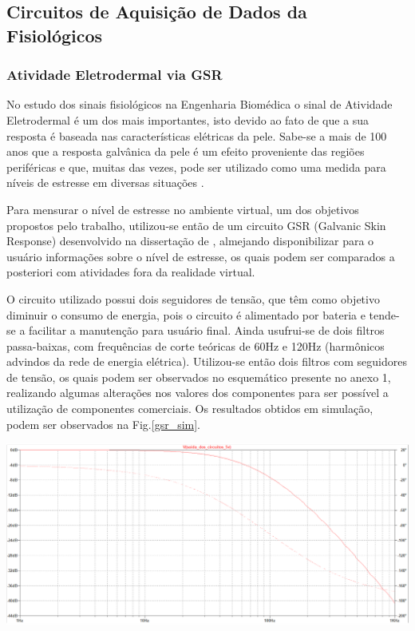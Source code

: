     

\subsection{Circuitos de Aquisição de Dados da Fisiológicos}

\subsubsection{Atividade Eletrodermal via GSR}
    No estudo dos sinais fisiológicos na Engenharia Biomédica o sinal de Atividade Eletrodermal é um dos mais importantes, isto devido ao fato de que a sua resposta é baseada nas características elétricas da pele. Sabe-se a mais de 100 anos \cite{eletrodermal_1} que a resposta galvânica da pele é um efeito proveniente das regiões periféricas e que, muitas das vezes, pode ser utilizado como uma medida para níveis de estresse em diversas situações \cite{eletrodermal_2}. 

	Para mensurar o nível de estresse no ambiente virtual, um dos objetivos propostos pelo trabalho, utilizou-se então de um circuito GSR (Galvanic Skin Response) desenvolvido na dissertação de \cite{miranda2015}, almejando disponibilizar para o usuário informações sobre o nível de estresse, os quais podem ser comparados a posteriori com atividades fora da realidade virtual.

	O circuito utilizado possui dois seguidores de tensão, que têm como objetivo diminuir o consumo de energia, pois o circuito é alimentado por bateria e tende-se a facilitar a manutenção para usuário final. Ainda usufrui-se de dois filtros passa-baixas, com frequências de corte teóricas de 60Hz e 120Hz (harmônicos advindos da rede de energia elétrica). Utilizou-se então dois filtros com seguidores de tensão, os quais podem ser observados no esquemático presente no anexo 1, realizando algumas alterações nos valores dos componentes para ser possível a utilização de componentes comerciais.
	Os resultados obtidos em simulação, podem ser observados na Fig.\ref{gsr_sim}.
    
    \begin{center}
    	\includegraphics[scale=0.3]{figuras/Resultados_Simulacao_GSR}
        \label{gsr_sim}
    \end{center}
    

